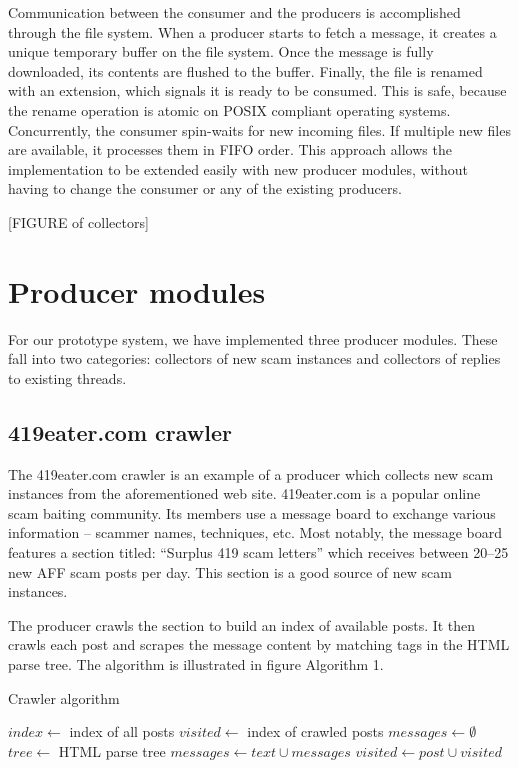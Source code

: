 Communication between the consumer and the producers is accomplished through the file system. When a producer starts to fetch a message, it creates a unique temporary buffer on the file system. Once the message is fully downloaded, its contents are flushed to the buffer. Finally, the file is renamed with an extension, which signals it is ready to be consumed. This is safe, because the rename operation is atomic on POSIX compliant operating systems. Concurrently, the consumer spin-waits for new incoming files. If multiple new files are available, it processes them in FIFO order. This approach allows the implementation to be extended easily with new producer modules, without having to change the consumer or any of the existing producers. 

[FIGURE of collectors]

\section{Producer modules}
For our prototype system, we have implemented three producer modules. These fall into two categories: collectors of new scam instances and collectors of replies to existing threads.

\subsection{419eater.com crawler}
The 419eater.com crawler is an example of a producer which collects new scam instances from the aforementioned web site. 419eater.com is a popular online scam baiting community. Its members use a message board to exchange various information -- scammer names, techniques, etc. Most notably, the message board features a section titled: ``Surplus 419 scam letters'' which receives between 20--25 new AFF scam posts per day. This section is a good source of new scam instances.

The producer crawls the section to build an index of available posts. It then crawls each post and scrapes the message content by matching tags in the HTML parse tree. The algorithm is illustrated in figure Algorithm 1.

\begin{algorithm}
\caption{Crawler algorithm}
\begin{algorithmic}
\State $index\gets $ index of all posts
\State $visited\gets $ index of crawled posts
\State $messages\gets \emptyset$ 
	\State $tree \gets $ HTML parse tree
			\State $messages \gets text \cup messages$ 
		\EndIf
	\EndFor
	\State $visited \gets post \cup visited$
\EndFor
\end{algorithmic}
\end{algorithm}

